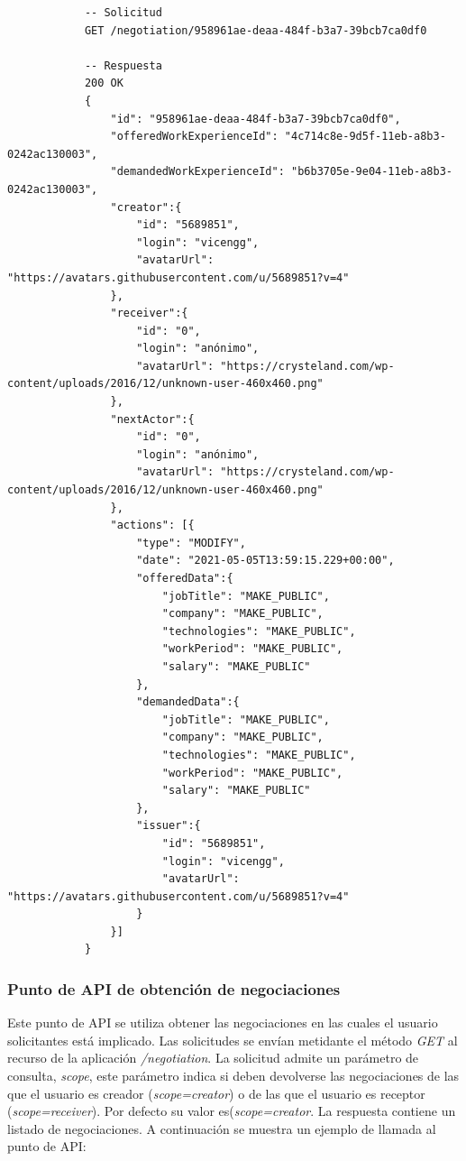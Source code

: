 \documentclass[a4paper, 12pt]{book}
\begin{document}
			{\footnotesize
			\begin{verbatim}
			-- Solicitud
			GET /negotiation/958961ae-deaa-484f-b3a7-39bcb7ca0df0

			-- Respuesta
			200 OK
			{
			    "id": "958961ae-deaa-484f-b3a7-39bcb7ca0df0",
			    "offeredWorkExperienceId": "4c714c8e-9d5f-11eb-a8b3-0242ac130003",
			    "demandedWorkExperienceId": "b6b3705e-9e04-11eb-a8b3-0242ac130003",
			    "creator":{
			        "id": "5689851",
			        "login": "vicengg",
			        "avatarUrl": "https://avatars.githubusercontent.com/u/5689851?v=4"
			    },
			    "receiver":{
			        "id": "0",
			        "login": "anónimo",
			        "avatarUrl": "https://crysteland.com/wp-content/uploads/2016/12/unknown-user-460x460.png"
			    },
			    "nextActor":{
			        "id": "0",
			        "login": "anónimo",
			        "avatarUrl": "https://crysteland.com/wp-content/uploads/2016/12/unknown-user-460x460.png"
			    },
			    "actions": [{
			        "type": "MODIFY",
			        "date": "2021-05-05T13:59:15.229+00:00",
			        "offeredData":{
			            "jobTitle": "MAKE_PUBLIC",
			            "company": "MAKE_PUBLIC",
			            "technologies": "MAKE_PUBLIC",
			            "workPeriod": "MAKE_PUBLIC",
			            "salary": "MAKE_PUBLIC"
			        },
			        "demandedData":{
			            "jobTitle": "MAKE_PUBLIC",
			            "company": "MAKE_PUBLIC",
			            "technologies": "MAKE_PUBLIC",
			            "workPeriod": "MAKE_PUBLIC",
			            "salary": "MAKE_PUBLIC"
			        },
			        "issuer":{
			            "id": "5689851",
			            "login": "vicengg",
			            "avatarUrl": "https://avatars.githubusercontent.com/u/5689851?v=4"
			        }
			    }]
			}
			\end{verbatim}
			}

\subsubsection{Punto de API de obtención de negociaciones}
\label{subsec:get_negotiation}
Este punto de API se utiliza obtener las negociaciones en las cuales el usuario solicitantes está implicado.
Las solicitudes se envían metidante el método \emph{GET} al recurso de la aplicación \emph{/negotiation}.
La solicitud admite un parámetro de consulta, \emph{scope},
este parámetro indica si deben devolverse las negociaciones de las que el usuario es creador (\emph{scope=creator}) o de las que el usuario es receptor (\emph{scope=receiver}).
Por defecto su valor es(\emph{scope=creator}.
La respuesta contiene un listado de negociaciones.
A continuación se muestra un ejemplo de llamada al punto de API:
\end{document}
